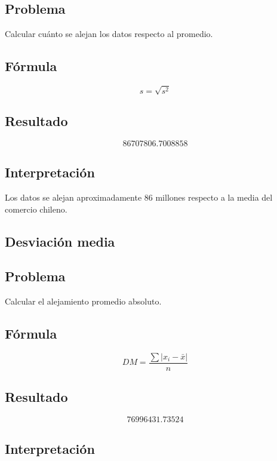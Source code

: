 \documentclass[12pt]{article}
\begin{document}
\subsection*{Problema}

Calcular cuánto se alejan los datos respecto al promedio.

\subsection*{Fórmula}

\[
s = \sqrt{s^2}
\]

\subsection*{Resultado}

\[
86707806.7008858
\]

\subsection*{Interpretación}

Los datos se alejan aproximadamente 86 millones respecto a la media del comercio chileno.


\subsection{Desviación media}

\subsection*{Problema}

Calcular el alejamiento promedio absoluto.

\subsection*{Fórmula}

\[
DM = \frac{\sum |x_i-\bar{x}|}{n}
\]

\subsection*{Resultado}

\[
76996431.73524
\]

\subsection*{Interpretación}
\end{document}
